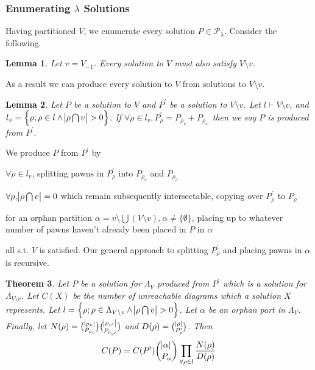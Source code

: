 \documentclass{amsart}
\newtheorem{theorem}{Theorem}[section]
\newtheorem{lemma}[theorem]{Lemma}
\begin{document}
\subsubsection{Enumerating $\lambda$ Solutions} Having partitioned $V$, we enumerate every solution $P \in \mathcal{P_\lambda}$. Consider the following.

\begin{lemma}
	Let $v = V_{-1}$. Every solution to $V$ must also satisfy $V \setminus v$.
\end{lemma}

As a result we can produce every solution to $V$ from solutions to $V \setminus v$.

\begin{lemma}
	 Let $P$ be a solution to $V$ and $P^\prime$ be a solution to $V \setminus v$. Let $l \vdash V \setminus v$, and $l_v = \set{\rho; \rho \in l \land \abs{\rho \bigcap v} > 0}$. If $\forall \rho \in l_v, P^\prime_\rho = P_{\rho_v} + P_{\rho_{v^\prime}}$ then we say $P$ is produced from $P^\prime$.
\end{lemma}

We produce $P$ from $P^\prime$ by \begin{inparaenum} \item $\forall \rho \in l_v$, splitting pawns in $P^\prime_\rho$ into $P_{\rho_v}$ and $P_{\rho_{v^\prime}}$ \item $\forall \rho, \abs{\rho \bigcap v} = 0$ which remain subsequently intersectable, copying over $P^\prime_\rho$ to $P_\rho$ \item for an orphan partition $\alpha = v \setminus \bigcup (V \setminus v), \alpha \not = \{\emptyset\}$, placing up to whatever number of pawns haven't already been placed in $P$ in $\alpha$ \end{inparaenum} all s.t$.$ $V$ is satisfied. Our general approach to splitting $P^\prime_\rho$ and placing pawns in $\alpha$ is recursive.

\begin{theorem}
	Let $P$ be a solution for $\Lambda_V$ produced from $P^\prime$ which is a solution for $\Lambda_{V \setminus v}$. Let $C(X)$ be the number of unreachable diagrams which a solution $X$ represents. Let $l = \set{\rho; \rho \in \Lambda_{V \setminus v} \land \abs{\rho \bigcap v} > 0}$. Let $\alpha$ be an orphan part in $\Lambda_V$. Finally, let $N(\rho) = \binom{\abs{\rho_v}}{P_{\rho_v}} \binom{\abs{\rho_{v^\prime}}}{P_{\rho_{v^\prime}}}$ and $D(\rho) = \binom{\abs{\rho}}{P^\prime_\rho}$. Then $$C(P) = C(P^\prime) \binom{\abs{\alpha}}{P_\alpha} \prod_{\forall \rho \in l} \frac{N(\rho)}{D(\rho)}$$
\end{theorem}
\end{document}
